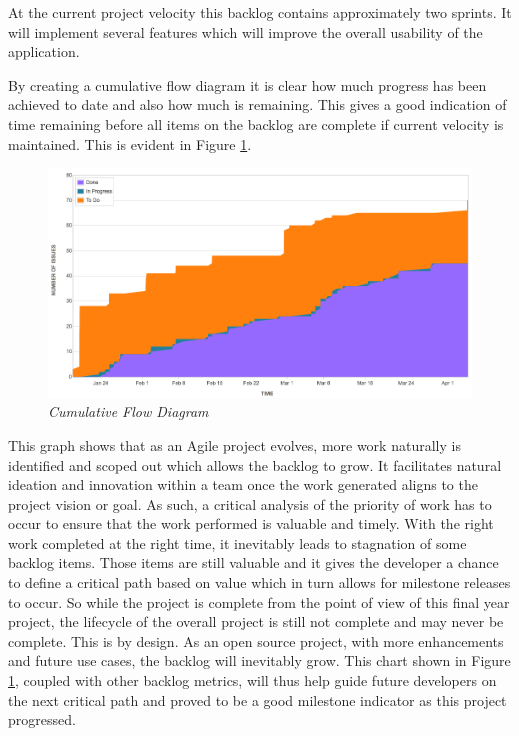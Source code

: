 At the current project velocity this backlog contains approximately two sprints. It will implement several features which will improve the overall usability of the application. 

By creating a cumulative flow diagram it is clear how much progress has been achieved to date and also how much is remaining. This gives a good indication of time remaining before all items on the backlog are complete if current velocity is maintained. This is evident in Figure \ref{fig:cumulative_flow}.

\clearpage

\begin{figure}[!ht]
	\centering
	\includegraphics*[width=\textwidth]{images/cumulative_flow}
	\caption{\em Cumulative Flow Diagram}
	\label{fig:cumulative_flow}
\end{figure}

This graph shows that as an Agile project evolves, more work naturally is identified and scoped out which allows the backlog to grow. It facilitates natural ideation and innovation within a team once the work generated aligns to the project vision or goal. As such, a critical analysis of the priority of work has to occur to ensure that the work performed is valuable and timely. With the right work completed at the right time, it inevitably leads to stagnation of some backlog items. Those items are still valuable and it gives the developer a chance to define a critical path based on value which in turn allows for milestone releases to occur. So while the project is complete from the point of view of this final year project, the lifecycle of the overall project is still not complete and may never be complete. This is by design. As an open source project, with more enhancements and future use cases, the backlog will inevitably grow. This chart shown in Figure \ref{fig:cumulative_flow}, coupled with other backlog metrics, will thus help guide future developers on the next critical path and proved to be a good milestone indicator as this project progressed.

